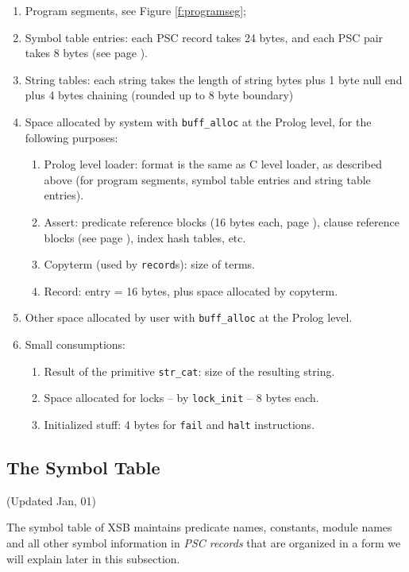 \documentclass[11pt]{article}
\begin{document}
\begin{enumerate}
\item  Program segments, see Figure \ref{f:programseg};
\item  Symbol table entries: each PSC record takes 24 bytes,
   and each PSC pair takes 8 bytes (see page \pageref{pg:symtab}).
\item  String tables: each string takes the length of string bytes
   plus 1 byte null end plus 4 bytes chaining (rounded up to 8 byte boundary)
\item  Space allocated by system with {\tt buff\_alloc} at the Prolog level,
   for the following purposes:
   \begin{enumerate}
	\item Prolog level loader: format is the same as C level loader, as
	  described above (for program segments, symbol table entries and
	  string table entries).
	\item Assert: predicate reference blocks (16 bytes each, page 
	  \pageref{pg:predref}), clause reference blocks (see page
	  \pageref{pg:clauseref}), index hash tables, etc.
	\item Copyterm (used by {\tt record}s): size of terms.
	\item Record: entry = 16 bytes, plus space allocated by copyterm.
   \end{enumerate}
\item  Other space allocated by user with {\tt buff\_alloc} at the 
	Prolog level.
\item  Small consumptions:
   \begin{enumerate}
	\item Result of the primitive {\tt str\_cat}: size of the resulting
	  string.
	\item Space allocated for locks -- by {\tt lock\_init} -- 8 bytes each.
	\item Initialized stuff: 4 bytes for {\tt fail} and {\tt halt} 
		instructions.
   \end{enumerate}
\end{enumerate}


\subsection{The Symbol Table} (Updated Jan, 01)

\label{pg:symtab}
The symbol table of XSB maintains predicate names, constants, module
names and all other symbol information in {\em PSC records} that are
organized in a form we will explain later in this subsection.  
\end{document}
